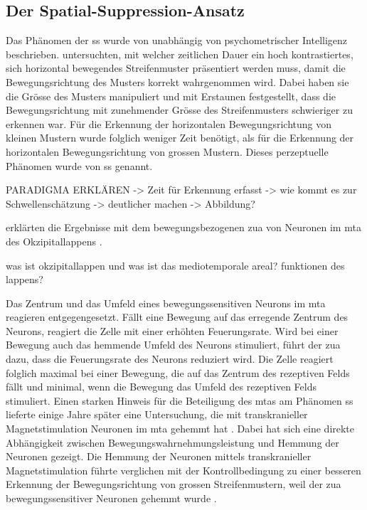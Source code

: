 \documentclass[11pt, twoside, a4paper]{book}		%
\begin{document}
\subsection{Der Spatial-Suppression-Ansatz}


Das Phänomen der \gls{ss} wurde von \citet{Tadin2003} unabhängig von psychometrischer Intelligenz beschrieben. \citeauthor{Tadin2003} untersuchten, mit welcher zeitlichen Dauer ein hoch kontrastiertes, sich horizontal bewegendes Streifenmuster präsentiert werden muss, damit die Bewegungsrichtung des Musters korrekt wahrgenommen wird. Dabei haben sie die Grösse des Musters manipuliert und mit Erstaunen festgestellt, dass die Bewegungsrichtung mit zunehmender Grösse des Streifenmusters schwieriger zu erkennen war. Für die Erkennung der horizontalen Bewegungsrichtung von kleinen Mustern wurde folglich weniger Zeit benötigt, als für die Erkennung der horizontalen Bewegungsrichtung von grossen Mustern. Dieses perzeptuelle Phänomen wurde von \citeauthor{Tadin2003} \gls{ss} genannt. %

PARADIGMA ERKLÄREN -> Zeit für Erkennung erfasst -> wie kommt es zur Schwellenschätzung -> deutlicher machen -> Abbildung?

\citeauthor{Tadin2003} erklärten die Ergebnisse mit dem bewegungsbezogenen \gls{zua} von Neuronen im \gls{mta} des Okzipitallappens \citep{Allman1985a}. 

was ist okzipitallappen und was ist das mediotemporale areal? funktionen des lappens?

Das Zentrum und das Umfeld eines bewegungssensitiven Neurons im \gls{mta} reagieren entgegengesetzt. Fällt eine Bewegung auf das erregende Zentrum des Neurons, reagiert die Zelle mit einer erhöhten Feuerungsrate. Wird bei einer Bewegung auch das hemmende Umfeld des Neurons stimuliert, führt der \gls{zua} dazu, dass die Feuerungsrate des Neurons reduziert wird. Die Zelle reagiert folglich maximal bei einer Bewegung, die auf das Zentrum des rezeptiven Felds fällt und minimal, wenn die Bewegung das Umfeld des rezeptiven Felds stimuliert. Einen starken Hinweis für die Beteiligung des \gls{mta}s am Phänomen \gls{ss} lieferte einige Jahre später eine Untersuchung, die mit transkranieller Magnetstimulation Neuronen im \gls{mta} gehemmt hat \citep{Tadin2011}. 
Dabei hat sich eine direkte Abhängigkeit zwischen Bewegungswahrnehmungsleistung und Hemmung der Neuronen gezeigt. Die Hemmung der Neuronen mittels transkranieller Magnetstimulation führte verglichen mit der Kontrollbedingung zu einer besseren Erkennung der Bewegungsrichtung von grossen Streifenmustern,  weil der \gls{zua} bewegungssensitiver Neuronen gehemmt wurde \citep{Tadin2011}.
\end{document}

